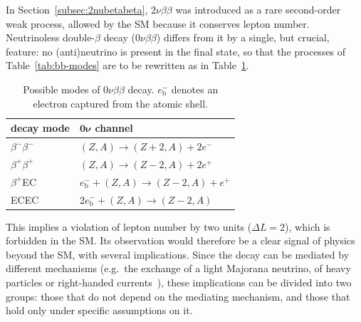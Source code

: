In Section~\ref{subsec:2nubetabeta}, $2\nu\beta\beta$ was introduced as a rare second-order weak process, allowed by the \ac{SM} because it conserves lepton number. Neutrinoless double-$\beta$ decay ($0\nu\beta\beta$) differs from it by a single, but crucial, feature: no (anti)neutrino is present in the final state, so that the processes of Table~\ref{tab:bb-modes} are to be rewritten as in Table~\ref{tab:0nubb-modes}.


\begin{table}[H]
    \centering
    \begin{tabular}{ll}
        \toprule
        \textbf{decay mode} & $\boldsymbol{0\nu}$ \textbf{channel} \\
        \midrule
        $\beta^-\beta^-$ & $(Z,A) \to (Z+2,A) + 2e^-$\\
        $\beta^+\beta^+$ & $(Z,A) \to (Z-2,A) + 2e^+$\\
        $\beta^+$\ac{EC} & $e^-_\text{b} + (Z,A) \to (Z-2,A) + e^+$ \\
        \ac{EC}\ac{EC} & $2e^-_\text{b} + (Z,A) \to (Z-2,A)$\\
        \bottomrule
    \end{tabular}
    \caption{Possible modes of $0\nu\beta\beta$ decay. $e^-_\text{b}$ denotes an electron captured from the atomic shell.}
    \label{tab:0nubb-modes}
\end{table}


This implies a violation of lepton number by two units ($\Delta L=2$), which is forbidden in the \ac{SM}. Its observation would therefore be a clear signal of physics beyond the \ac{SM}, with several implications. Since the decay can be mediated by different mechanisms (e.g.\ the exchange of a light Majorana neutrino, of heavy particles or right-handed currents~\cite{review-0nu-2015}), these implications can be divided into two groups: those that do not depend on the mediating mechanism, and those that hold only under specific assumptions on it.

